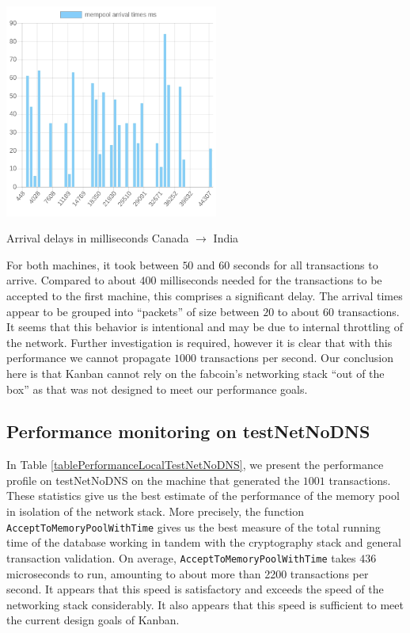 \documentclass{article}
\begin{document}
\begin{table}
	\begin{center}
		\includegraphics[width = 7cm]{./images/mempoolArrivalsMumbai.png}
	\end{center}
	\caption{\label{tableArrivalTimesToMumbai} Arrival delays in milliseconds Canada $ \to$ India}
\end{table}

For both machines, it took between $50$ and $60$ seconds for all transactions to arrive. Compared to about $400$ milliseconds needed for the transactions to be accepted to the first machine, this comprises a significant delay. The arrival times appear to be grouped into ``packets'' of size between $20$ to about $60$ transactions. It seems that this behavior is intentional and may be due to internal throttling of the network. Further investigation is required, however it is clear that with this performance we cannot propagate $1000$ transactions per second. Our conclusion here is that Kanban cannot rely on the fabcoin's networking stack ``out of the box'' as that was not designed to meet our performance goals. 


\subsection{Performance monitoring on testNetNoDNS}
In Table \ref{tablePerformanceLocalTestNetNoDNS}, we present the performance profile on testNetNoDNS on the machine that generated the $1001$ transactions. These statistics give us the best estimate of the performance of the memory pool in isolation of the network stack. More precisely, the function \verb|AcceptToMemoryPoolWithTime| gives us the best measure of the total running time of the database working in tandem with the cryptography stack and general transaction validation. On average, \verb|AcceptToMemoryPoolWithTime| takes $436$ microseconds to run, amounting to about more than 2200 transactions per second. It appears that this speed is satisfactory and exceeds the speed of the networking stack considerably. It also appears that this speed is sufficient to meet the current design goals of Kanban.  
\end{document}
